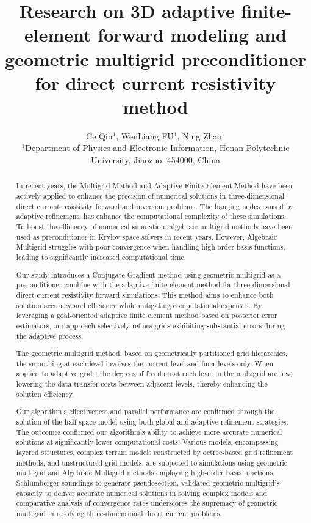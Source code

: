 \documentclass[extra, referee]{gji}
\begin{document}
\title{Research on 3D adaptive finite-element forward modeling and geometric multigrid preconditioner for direct current resistivity method}
\author[Ce Qin]{Ce Qin$^{1}$, WenLiang FU$^{1}$, Ning Zhao$^{1}$ \\
  $^{1}$Department of Physics and Electronic Information,
  Henan Polytechnic University, Jiaozuo, 454000, China
}

\maketitle

\begin{abstract}
In recent years, the Multigrid Method and Adaptive Finite Element Method have
been actively applied to enhance the precision of numerical solutions in
three-dimensional direct current resistivity forward and inversion problems. The
hanging nodes caused by adaptive refinement, has enhance the computational
complexity of these simulations. To boost the efficiency of numerical
simulation, algebraic multigrid methods have been used as preconditioner in
Krylov space solvers in recent years. However, Algebraic Multigrid struggles
with poor convergence when handling high-order basis functions, leading to
significantly increased computational time.

Our study introduces a Conjugate Gradient method using geometric multigrid as a
preconditioner combine with the adaptive finite element method for
three-dimensional direct current resistivity forward simulations. This method
aims to enhance both solution accuracy and efficiency while mitigating
computational expenses. By leveraging a goal-oriented adaptive finite element
method based on posterior error estimators, our approach selectively refines
grids exhibiting substantial errors during the adaptive process.

The geometric multigrid method, based on geometrically partitioned grid
hierarchies, the smoothing at each level involves the current level and finer
levels only. When applied to adaptive grids, the degrees of freedom at each
level in the multigrid are low, lowering the data transfer costs between
adjacent levels, thereby enhancing the solution efficiency.

Our algorithm's effectiveness and parallel performance are confirmed through the
solution of the half-space model using both global and adaptive refinement
strategies. The outcomes confirmed our algorithm's ability to achieve more
accurate numerical solutions at significantly lower computational costs. Various
models, encompassing layered structures, complex terrain models constructed by
octree-based grid refinement methods, and unstructured grid models, are
subjected to simulations using geometric multigrid and Algebraic Multigrid
methods employing high-order basis functions. Schlumberger soundings to generate
pseudosection, validated geometric multigrid's capacity to deliver accurate
numerical solutions in solving complex models and comparative analysis of
convergence rates underscores the supremacy of geometric multigrid in resolving
three-dimensional direct current problems.


\end{abstract}
\end{document}
